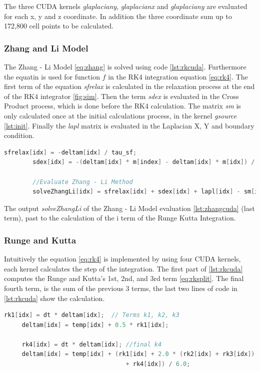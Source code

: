 The three CUDA kernels \textit{glaplaciany}, \textit{glaplacianx} and \textit{glaplaciany} are evaluated for each x, y and z coordinate. In addition the three coordinate sum up to 172,800 cell points to be calculated.

\subsubsection{Zhang and Li Model}

The Zhang - Li Model \ref{eq:zhang} is solved using code \ref{lst:rkcuda}. Furthermore the equatin is used for function $f$ in the RK4 integration equation \ref{eq:rk4}. The first term of the equation \textit{sfrelax} is calculated in the relaxation process at the end of the RK4 integrator \ref{fig:sim}. Then the term \textit{sdex} is evaluated in the Cross Product process, which is done before the RK4 calculation. The matrix \textit{sm} is only calculated once at the initial calculations process, in the kernel \textit{gsource} \ref{lst:init}. Finally the \textit{lapl} matrix is evaluated in the Laplacian X, Y and boundary condition.

\begin{lstlisting}[language=C++, label={lst:zhangcuda}, caption={Runge and Kutta 4th Terms}]
		sfrelax[idx] = -deltam[idx] / tau_sf;
		sdex[idx] = -(deltam[idx] * m[index] - deltam[idx] * m[idx]) / tau_sd;
		
		//Evaluate Zhang - Li Method
        solveZhangLi[idx] = sfrelax[idx] + sdex[idx] + lapl[idx] - sm[idx];
\end{lstlisting}


The output  \textit{solveZhangLi} of the Zhang - Li Model evaluation \ref{lst:zhangcuda}  (last term), past to the calculation of the i term of the Runge Kutta Integration.

\subsubsection{Runge and Kutta}
 
  Intuitively the equation \ref{eq:rk4} is implemented by using four CUDA kernels, each kernel calculates the step of the integration. The first part of \ref{lst:rkcuda} computes the Runge and Kutta's 1st, 2nd, and 3rd  term \ref{eq:rksplit}. The final fourth term, is the sum of the previous 3 terms, the last two lines of code in \ref{lst:rkcuda} show the calculation.

\begin{lstlisting}[language=C++, label={lst:rkcuda}, caption={Runge and Kutta 4th Terms}]
     rk1[idx] = dt * deltam[idx];  // Terms k1, k2, k3
     deltam[idx] = temp[idx] + 0.5 * rk1[idx];
     
     rk4[idx] = dt * deltam[idx]; //final k4
     deltam[idx] = temp[idx] + (rk1[idx] + 2.0 * (rk2[idx] + rk3[idx])
                                  + rk4[idx]) / 6.0;
\end{lstlisting}


